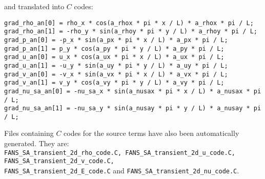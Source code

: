 \documentclass[10pt]{article}
\begin{document}
 and translated into $C$ codes:
\begin{verbatim}
grad_rho_an[0] = rho_x * cos(a_rhox * pi * x / L) * a_rhox * pi / L;
grad_rho_an[1] = -rho_y * sin(a_rhoy * pi * y / L) * a_rhoy * pi / L;
grad_p_an[0] = -p_x * sin(a_px * pi * x / L) * a_px * pi / L;
grad_p_an[1] = p_y * cos(a_py * pi * y / L) * a_py * pi / L;
grad_u_an[0] = u_x * cos(a_ux * pi * x / L) * a_ux * pi / L;
grad_u_an[1] = -u_y * sin(a_uy * pi * y / L) * a_uy * pi / L;
grad_v_an[0] = -v_x * sin(a_vx * pi * x / L) * a_vx * pi / L;
grad_v_an[1] = v_y * cos(a_vy * pi * y / L) * a_vy * pi / L;
grad_nu_sa_an[0] = -nu_sa_x * sin(a_nusax * pi * x / L) * a_nusax * pi / L;
grad_nu_sa_an[1] = -nu_sa_y * sin(a_nusay * pi * y / L) * a_nusay * pi / L;
\end{verbatim}

Files containing $C$ codes for the source terms have also been automatically generated. They are:\\ \texttt{FANS\_SA\_transient\_2d\_rho\_code.C, FANS\_SA\_transient\_2d\_u\_code.C, FANS\_SA\_transient\_2d\_v\_code.C,\\ FANS\_SA\_transient\_2d\_E\_code.C} and \texttt{FANS\_SA\_transient\_2d\_nu\_code.C}.
\end{document}
